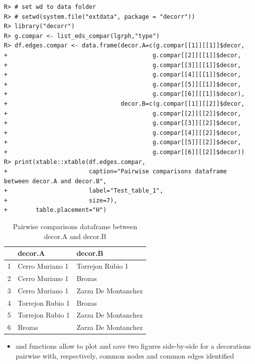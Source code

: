 \documentclass[article]{jss}\usepackage{knitr}
\begin{document}
\begin{kframe}
\begin{verbatim}
R> # set wd to data folder
R> # setwd(system.file("extdata", package = "decorr"))
R> library("decorr")
R> g.compar <- list_eds_compar(lgrph,"type")
R> df.edges.compar <- data.frame(decor.A=c(g.compar[[1]][[1]]$decor,
+                                         g.compar[[2]][[1]]$decor,
+                                         g.compar[[3]][[1]]$decor,
+                                         g.compar[[4]][[1]]$decor,
+                                         g.compar[[5]][[1]]$decor,
+                                         g.compar[[6]][[1]]$decor),
+                                decor.B=c(g.compar[[1]][[2]]$decor,
+                                         g.compar[[2]][[2]]$decor,
+                                         g.compar[[3]][[2]]$decor,
+                                         g.compar[[4]][[2]]$decor,
+                                         g.compar[[5]][[2]]$decor,
+                                         g.compar[[6]][[2]]$decor))
R> print(xtable::xtable(df.edges.compar,
+                       caption="Pairwise comparisons dataframe between decor.A and decor.B",
+                       label="Test_table_1",
+                       size=7),
+        table.placement="H")
\end{verbatim}
\end{kframe}%
\begin{table}[H]
\centering
\begin{tabular}{rll}
  \hline
 & decor.A & decor.B \\ 
  \hline
1 & Cerro Muriano 1 & Torrejon Rubio 1 \\ 
  2 & Cerro Muriano 1 & Brozas \\ 
  3 & Cerro Muriano 1 & Zarza De Montanchez \\ 
  4 & Torrejon Rubio 1 & Brozas \\ 
  5 & Torrejon Rubio 1 & Zarza De Montanchez \\ 
  6 & Brozas & Zarza De Montanchez \\ 
   \hline
\end{tabular}
\caption{Pairwise comparisons dataframe between decor.A and decor.B} 
\label{Test_table_1}
\end{table}


\begin{itemize}
\setlength\itemsep{.1em}
  \item {} and  functions allow to plot and save two figures side-by-side for a decorations pairwise with, respectively, common nodes and common edges identified
\end{itemize}
\end{document}
